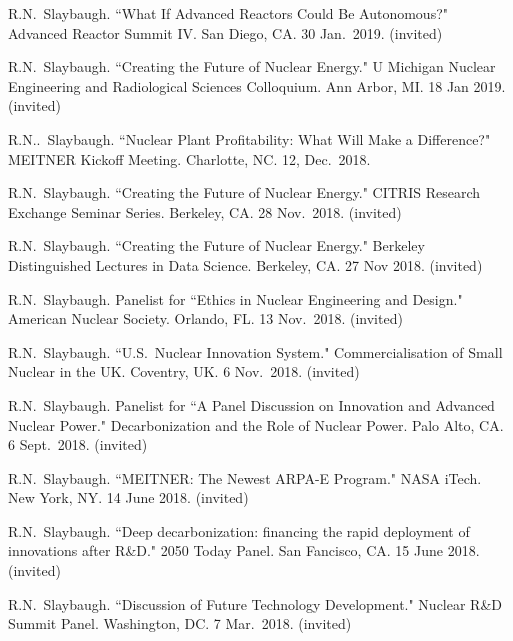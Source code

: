 \begin{bibsection}
\item R.N.\ Slaybaugh. ``What If  Advanced Reactors Could Be Autonomous?" Advanced Reactor Summit IV. San Diego, CA. 30 Jan.\ 2019. (invited)

\item R.N.\ Slaybaugh. ``Creating the Future of Nuclear Energy." U Michigan Nuclear Engineering and Radiological Sciences Colloquium. Ann Arbor, MI. 18 Jan 2019. (invited)

\item R.N..\ Slaybaugh. ``Nuclear Plant Profitability: What Will Make a Difference?" MEITNER Kickoff Meeting. Charlotte, NC. 12, Dec.\ 2018.

\item R.N.\ Slaybaugh. ``Creating the Future of Nuclear Energy." CITRIS Research Exchange Seminar Series. Berkeley, CA. 28 Nov.\ 2018. (invited)

\item R.N.\ Slaybaugh. ``Creating the Future of Nuclear Energy." Berkeley Distinguished Lectures in Data Science. Berkeley, CA. 27 Nov 2018. (invited)

\item R.N.\ Slaybaugh. Panelist for ``Ethics in Nuclear Engineering and Design." American Nuclear Society. Orlando, FL. 13 Nov.\ 2018. (invited)

\item R.N.\ Slaybaugh.  ``U.S.\ Nuclear Innovation System." Commercialisation of Small Nuclear in the UK. Coventry, UK. 6 Nov.\ 2018. (invited)

\item R.N.\ Slaybaugh. Panelist for ``A Panel Discussion on Innovation and Advanced Nuclear Power." Decarbonization and the Role of Nuclear Power. Palo Alto, CA. 6 Sept.\ 2018. (invited)

\item R.N.\ Slaybaugh.  ``MEITNER: The Newest ARPA-E Program." NASA iTech. New York, NY. 14 June 2018. (invited)

\item R.N.\ Slaybaugh.  ``Deep decarbonization: financing the rapid deployment of innovations after R\&D." 2050 Today Panel. San Fancisco, CA. 15 June 2018. (invited)

\item R.N.\ Slaybaugh. ``Discussion of Future Technology Development." Nuclear R\&D Summit Panel. Washington, DC. 7 Mar.\ 2018. (invited)


\end{bibsection}
